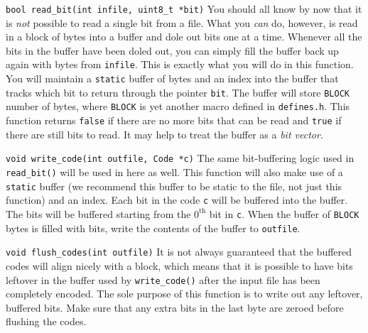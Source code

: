 \begin{funcdoc}{\texttt{bool read\_bit(int infile, uint8\_t *bit)}}
  You should all know by now that it is \emph{not} possible to read a
  single bit from a file. What you \emph{can} do, however, is read in a
  block of bytes into a buffer and dole out bits one at a time. Whenever
  all the bits in the buffer have been doled out, you can simply fill
  the buffer back up again with bytes from \texttt{infile}. This is
  exactly what you will do in this function. You will maintain a
  \texttt{static} buffer of bytes and an index into the buffer that
  tracks which bit to return through the pointer \texttt{bit}. The
  buffer will store \texttt{BLOCK} number of bytes, where \texttt{BLOCK}
  is yet another macro defined in \texttt{defines.h}. This function
  returns \texttt{false} if there are no more bits that can be read and
  \texttt{true} if there are still bits to read. It may help to treat
  the buffer as a \emph{bit vector}.
\end{funcdoc}

\begin{funcdoc}{\texttt{void write\_code(int outfile, Code *c)}}
  The same bit-buffering logic used in \texttt{read\_bit()} will be used
  in here as well. This function will also make use of a \texttt{static}
  buffer (we recommend this buffer to be static to the file, not just
  this function) and an index. Each bit in the code \texttt{c} will be
  buffered into the buffer. The bits will be buffered starting from the
  $0^\text{th}$ bit in \texttt{c}. When the buffer of \texttt{BLOCK}
  bytes is filled with bits, write the contents of the buffer to
  \texttt{outfile}.
\end{funcdoc}

\begin{funcdoc}{\texttt{void flush\_codes(int outfile)}}
  It is not always guaranteed that the buffered codes will align nicely
  with a block, which means that it is possible to have bits leftover in
  the buffer used by \texttt{write\_code()} after the input file has
  been completely encoded. The sole purpose of this function is to write
  out any leftover, buffered bits. Make sure that any extra bits in the
  last byte are zeroed before flushing the codes.
\end{funcdoc}
